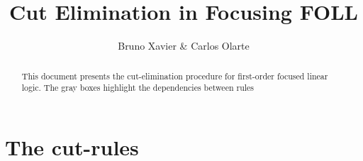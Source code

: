 \documentclass[12pt]{article}
\begin{document}
 


\title{
    {\large \textbf{Cut Elimination in Focusing FOLL}}}\author{Bruno Xavier \& Carlos Olarte}
 
\maketitle
 
 
 \begin{abstract}
This document presents the cut-elimination procedure for first-order focused linear logic. The gray boxes highlight the dependencies between rules

 \end{abstract}
\section{The cut-rules}
 
\end{document}
